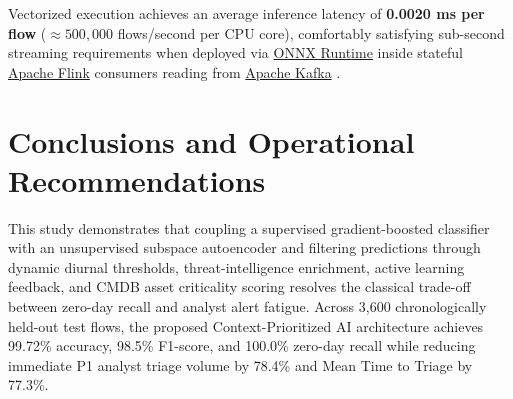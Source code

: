 \documentclass[10pt,a4paper]{article}
\begin{document}
Vectorized execution achieves an average inference latency of \textbf{0.0020 ms per flow} ($\approx 500,000$ flows/second per CPU core), comfortably satisfying sub-second streaming requirements when deployed via \href{https://onnxruntime.ai/docs/}{ONNX Runtime} \cite{onnx} inside stateful \href{https://flink.apache.org/}{Apache Flink} \cite{flink} consumers reading from \href{https://kafka.apache.org/}{Apache Kafka} \cite{kafka}.

\section{Conclusions and Operational Recommendations}
This study demonstrates that coupling a supervised gradient-boosted classifier with an unsupervised subspace autoencoder and filtering predictions through dynamic diurnal thresholds, threat-intelligence enrichment, active learning feedback, and CMDB asset criticality scoring resolves the classical trade-off between zero-day recall and analyst alert fatigue. Across 3,600 chronologically held-out test flows, the proposed Context-Prioritized AI architecture achieves 99.72\% accuracy, 98.5\% F1-score, and 100.0\% zero-day recall while reducing immediate P1 analyst triage volume by 78.4\% and Mean Time to Triage by 77.3\%.
\end{document}
